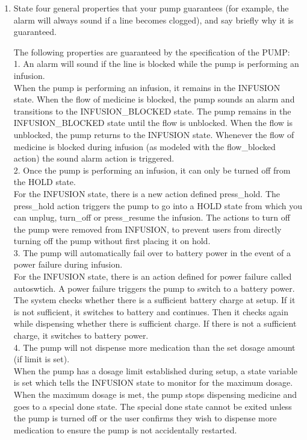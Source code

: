 ﻿\documentclass{article}
\begin{document}
\begin{enumerate}
    \item State four general properties that your pump guarantees (for example, the alarm will always sound if a line becomes clogged), and say briefly why it is guaranteed.


The following properties are guaranteed by the specification of the PUMP: \\


1. An alarm will sound if the line is blocked while the pump is performing an infusion. \\
When the pump is performing an infusion, it remains in the INFUSION state.  When the flow of medicine is blocked, the pump sounds an alarm and transitions to the INFUSION\_BLOCKED state.  The pump remains in the INFUSION\_BLOCKED state until the flow is unblocked.  When the flow is unblocked, the pump returns to the INFUSION state.  Whenever the flow of medicine is blocked during infusion (as modeled with the flow\_blocked action) the sound alarm action is triggered. \\

2. Once the pump is performing an infusion, it can only be turned off from the HOLD state. \\
For the INFUSION state, there is a new action defined press\_hold. The press\_hold action triggers the pump to go into a HOLD state from which you can unplug, turn\_off or press\_resume the infusion. The actions to turn off the pump were removed from INFUSION, to prevent users from directly turning off the pump without first placing it on hold. \\

3. The pump will automatically fail over to battery power in the event of a power failure during infusion. \\
For the INFUSION state, there is an action defined for power failure called autoswtich.  A power failure triggers the pump to switch to a battery power. The system checks whether there is a sufficient battery charge at setup. If it is not sufficient, it switches to battery and continues. Then it checks again while dispensing whether there is sufficient charge. If there is not a sufficient charge, it switches to battery power. \\

4. The pump will not dispense more medication than the set dosage amount (if limit is set). \\
When the pump has a dosage limit established during setup, a state variable is set which tells the INFUSION state to monitor for the maximum dosage.  When the maximum dosage is met, the pump stops dispensing medicine and goes to a special done state.  The special done state cannot be exited unless the pump is turned off or the user confirms they wish to dispense more medication to ensure the pump is not accidentally restarted. \\



\end{enumerate}
\end{document}

